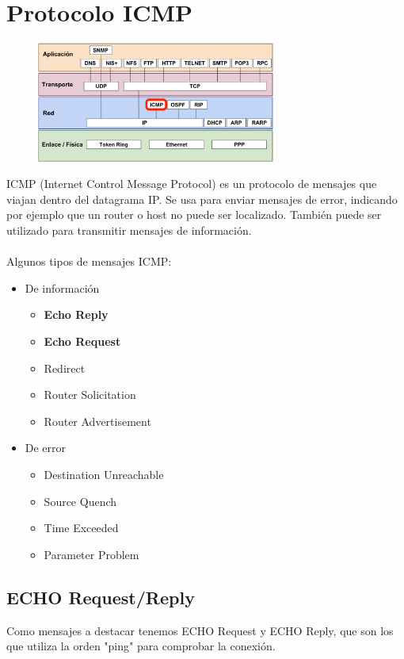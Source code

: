\section{Protocolo ICMP}
\begin{figure}[H]
    \centering
    \includegraphics[width=0.7\textwidth]{img/ICMP.png}
\end{figure}
ICMP (Internet Control Message Protocol) es un protocolo de mensajes que viajan dentro del datagrama IP. Se usa para enviar mensajes de error, indicando por ejemplo que un router o host no puede ser localizado. También puede ser utilizado para transmitir mensajes de información.
\\\\
Algunos tipos de mensajes ICMP:
\begin{itemize}
\item De información
	\begin{itemize}
	\item \textbf{Echo Reply}
	\item \textbf{Echo Request}
    \item Redirect
    \item Router Solicitation
    \item Router Advertisement
	\end{itemize}
\item De error
	\begin{itemize}
	\item Destination Unreachable
    \item Source Quench
    \item Time Exceeded
    \item Parameter Problem
	\end{itemize}
\end{itemize}
\subsection{ECHO Request/Reply}
Como mensajes a destacar tenemos ECHO Request y ECHO Reply, que son los que utiliza la orden "ping" para comprobar la conexión.\\

